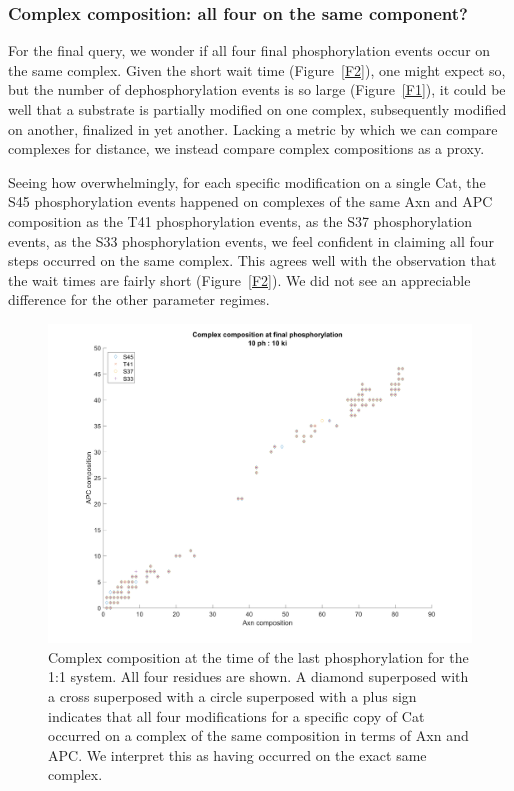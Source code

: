 \subsubsection{Complex composition: all four on the same component?}

For the final query, we wonder if all four final phosphorylation
events occur on the same complex. Given the short wait time
(Figure~\ref{F2}), one might expect so, but the number of
dephosphorylation events is so large (Figure~\ref{F1}), it could be
well that a substrate is partially modified on one complex,
subsequently modified on another, finalized in yet another. Lacking a
metric by which we can compare complexes for distance, we instead
compare complex compositions as a proxy.

Seeing how overwhelmingly, for each specific modification on a single
Cat, the S45 phosphorylation events happened on complexes of the same
Axn and APC composition as the T41 phosphorylation events, as the S37
phosphorylation events, as the S33 phosphorylation events, we feel
confident in claiming all four steps occurred on the same
complex. This agrees well with the observation that the wait times are
fairly short (Figure~\ref{F2}). We did not see an appreciable
difference for the other parameter regimes.

\begin{figure}[h]
  \centering
  \includegraphics[width=\columnwidth]{wnt/F11_complex_composition_10_10}
  \caption{Complex composition at the time of the last phosphorylation
    for the 1:1 system. All four residues are shown. A diamond
    superposed with a cross superposed with a circle superposed with a
    plus sign indicates that all four modifications for a specific
    copy of Cat occurred on a complex of the same composition in terms
    of Axn and APC. We interpret this as having occurred on the exact
    same complex.}
  \label{F11}
\end{figure}